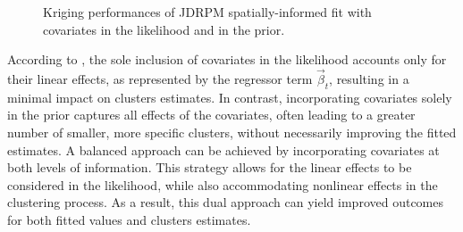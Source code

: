 \documentclass[12pt,	%
	a4paper,		%
	twoside,		%
	openright,		%
	titlepage,%
	]{book}
\theoremstyle{definition}
\let\cite\citep
\begin{document}
\begin{figure}[!p]
    \caption[Kriging performances of JDRPM, spatial information, covariates in the likelihood and in the prior]{Kriging performances of JDRPM spatially-informed fit with covariates in the likelihood and in the prior.}
    \label{fig:krig JDRPM space Xlk Xcl}
\end{figure}

According to \cite{paper-37}, the sole inclusion of covariates in the likelihood accounts only for their linear effects, as represented by the regressor term $\vec{\beta}_t$, resulting in a minimal impact on clusters estimates. In contrast, incorporating covariates solely in the prior captures all effects of the covariates, often leading to a greater number of smaller, more specific clusters, without necessarily improving the fitted estimates.
A balanced approach can be achieved by incorporating covariates at both levels of information. This strategy allows for the linear effects to be considered in the likelihood, while also accommodating nonlinear effects in the clustering process. As a result, this dual approach can yield improved outcomes for both fitted values and clusters estimates.



\end{document}
